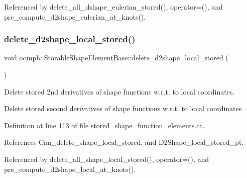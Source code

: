 Referenced by delete\+\_\+all\+\_\+dshape\+\_\+eulerian\+\_\+stored(), operator=(), and pre\+\_\+compute\+\_\+d2shape\+\_\+eulerian\+\_\+at\+\_\+knots().

\mbox{\label{classoomph_1_1StorableShapeElementBase_a5fdbd08df4534edccd62ea42591a0d41}} 
\subsubsection{\texorpdfstring{delete\+\_\+d2shape\+\_\+local\+\_\+stored()}{delete\_d2shape\_local\_stored()}}
{\footnotesize\ttfamily void oomph\+::\+Storable\+Shape\+Element\+Base\+::delete\+\_\+d2shape\+\_\+local\+\_\+stored (\begin{DoxyParamCaption}{ }\end{DoxyParamCaption})}



Delete stored 2nd derivatives of shape functions w.\+r.\+t. to local coordinates. 

Delete stored second derivatives of shape functions w.\+r.\+t. to local coordinates 

Definition at line 113 of file stored\+\_\+shape\+\_\+function\+\_\+elements.\+cc.



References Can\+\_\+delete\+\_\+shape\+\_\+local\+\_\+stored, and D2\+Shape\+\_\+local\+\_\+stored\+\_\+pt.



Referenced by delete\+\_\+all\+\_\+shape\+\_\+local\+\_\+stored(), operator=(), and pre\+\_\+compute\+\_\+d2shape\+\_\+local\+\_\+at\+\_\+knots().

\mbox{\label{classoomph_1_1StorableShapeElementBase_ac35521f80a49d09be8e318961f45ff3e}} 
